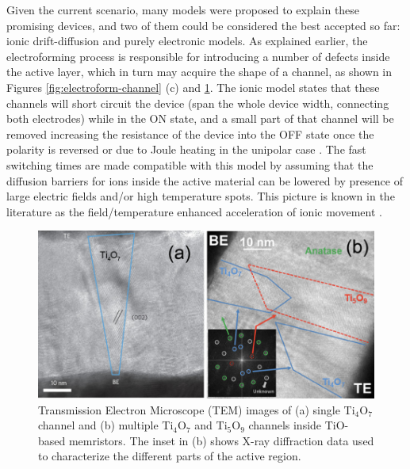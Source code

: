 Given the current scenario, many models were proposed to explain these promising devices, and two of them could be considered the best accepted so far: ionic drift-diffusion and purely electronic models. As explained earlier, the electroforming process is responsible for introducing a number of defects inside the active layer, which in turn may acquire the shape of a channel, as shown in Figures \ref{fig:electroform-channel} (c) and \ref{fig:canais-TiO}. The ionic model states that these channels will short circuit the device (span the whole device width, connecting both electrodes) while in the ON state, and a small part of that channel will be removed increasing the resistance of the device into the OFF state once the polarity is reversed or due to Joule heating in the unipolar case \cite{Pickett2009}. The fast switching times are made compatible with this model by assuming that the diffusion barriers for ions inside the active material can be lowered by presence of large electric fields and/or high temperature spots. This picture is known in the literature as the field/temperature enhanced acceleration of ionic movement \cite{Ielmini2012,Ielmini2011}.
\begin{center}
  \begin{figure}[h!]
    \begin{center}
      \includegraphics[width=12cm]{img/Jeong2012canaisTiO.jpg}
      \caption{Transmission Electron Microscope (TEM) images of (a) single Ti$_4$O$_7$ channel \cite{Kwon2010} and (b) multiple Ti$_4$O$_7$ and Ti$_5$O$_9$ channels \cite{HwanKim2011} inside TiO-based memristors. The inset in (b) shows X-ray diffraction data used to characterize the different parts of the active region.} 
      \label{fig:canais-TiO} 
    \end{center}
  \end{figure}
\end{center}

